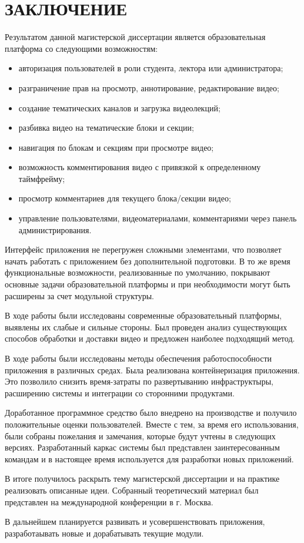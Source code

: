 \section*{ЗАКЛЮЧЕНИЕ}

Результатом данной магистерской диссертации является образовательная платформа со следующими
возможностям:
\begin{itemize}[wide,topsep=0pt]
  \itemsep0em
  \item авторизация пользователей в роли студента, лектора или администратора;
  \item разграничение прав на просмотр, аннотирование, редактирование видео;
  \item создание тематических каналов и загрузка видеолекций;
  \item разбивка видео на тематические блоки и секции;
  \item навигация по блокам и секциям при просмотре видео;
  \item возможность комментирования видео с привязкой к определенному таймфрейму;
  \item просмотр комментариев для текущего блока/секции видео;
  \item управление пользователями, видеоматериалами, комментариями через панель администрирования.
\end{itemize}

Интерфейс приложения не перегружен сложными элементами, что позволяет начать работать
с приложением без дополнительной подготовки.
В то же время функциональные возможности, реализованные по умолчанию, покрывают основные
задачи образовательной платформы и при необходимости могут быть расширены за счет модульной
структуры.

В ходе работы были исследованы современные образовательный платформы,
выявлены их слабые и сильные стороны. Был проведен анализ существующих способов обработки
и доставки видео и предложен наиболее подходящий метод.

В ходе работы были исследованы методы обеспечения работоспособности приложения в различных
средах. Была реализована контейнеризация приложения. Это позволило снизить время-затраты
по развертыванию инфраструктыры, расширению системы и интеграции со сторонними
продуктами.

Доработанное программное средство было внедрено на производстве и получило положительные
оценки пользователей. Вместе с тем, за время его использования, были собраны
пожелания и замечания, которые будут учтены в следующих версиях.
Разработанный каркас системы был представлен заинтересованным командам и в настоящее
время используется для разработки новых приложений.

В итоге получилось раскрыть тему магистерской диссертации и на практике реализовать
описанные идеи. Собранный теоретический материал был представлен на международной
конференции в г. Москва.

В дальнейшем планируется развивать и усовершенствовать приложения, разработаывать новые
и дорабатывать текущие модули.



